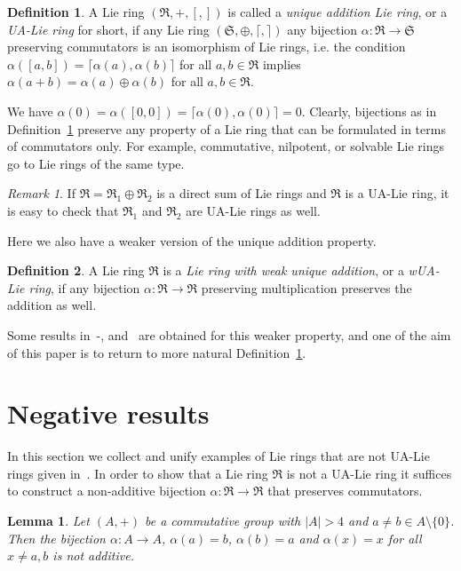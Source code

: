 \documentclass[a4paper,draft,reqno,12pt]{amsart}
\newtheorem{lemma}{Lemma}
\theoremstyle{definition}
\newtheorem{definition}{Definition}
\theoremstyle{remark}
\newtheorem {remark}{Remark}
\def\RRR{\mathfrak{R}}
\def\SSS{\mathfrak{S}}
\begin{document}
\begin{definition}
\label{deflie}
A Lie ring $(\RRR,+,[,])$ is called a {\it unique addition Lie ring}, or a {\it UA-Lie ring} for short, if any Lie ring $(\SSS,\oplus,\lceil,\rceil)$ any bijection $\alpha\colon \RRR\to\SSS$ preserving commutators is an isomorphism of Lie rings, i.e. the condition $\alpha([a,b])=\lceil\alpha(a),\alpha(b)\rceil$ for all $a,b\in\RRR$ implies $\alpha(a+b)=\alpha(a)\oplus\alpha(b)$ for all $a,b\in\RRR$. 
\end{definition} 
%
\smallskip
%
We have $\alpha(0)=\alpha([0,0])=\lceil\alpha(0),\alpha(0)\rceil=0.$ Clearly, bijections as in Definition~\ref{deflie} preserve any property of a Lie ring that can be formulated in terms of commutators only. For example, commutative, nilpotent, or solvable Lie rings go to Lie rings of the same type.  
%
\begin{remark}
If $\RRR=\RRR_1\oplus\RRR_2$ is a direct sum of Lie rings and $\RRR$ is a UA-Lie ring, it is easy to check that $\RRR_1$ and $\RRR_2$ are UA-Lie rings as well.
\end{remark}

Here we also have a weaker version of the unique addition property. 

\begin{definition}
\label{dada}
A Lie ring $\RRR$ is a {\it Lie ring with weak unique addition}, or a {\it wUA-Lie ring}, if any bijection $\alpha\colon\RRR\to\RRR$ preserving multiplication preserves the addition as well. 
\end{definition} 

Some results in~\cite{A1}-\cite{A4}, \cite{AT} and~\cite{Pon2} are obtained for this weaker property, and one of the aim of this paper is to return to more natural Definition~\ref{deflie}.

\section{Negative results} 
\label{nr}

In this section we collect and unify examples of Lie rings that are not UA-Lie rings given in~\cite{A1,A2,A4,AT}. In order to show that a Lie ring $\RRR$ is not a UA-Lie ring it suffices to construct a non-additive bijection $\alpha\colon\RRR\to\RRR$ that preserves commutators. 

\begin{lemma}
\label{lemnon}
Let $(A,+)$ be a commutative group with $|A|>4$ and $a\ne b\in A\setminus\{0\}$. Then the bijection $\alpha\colon A\to A$, $\alpha(a)=b$, $\alpha(b)=a$ and $\alpha(x)=x$ for all $x\ne a,b$ is not additive.
\end{lemma} 
\end{document}
